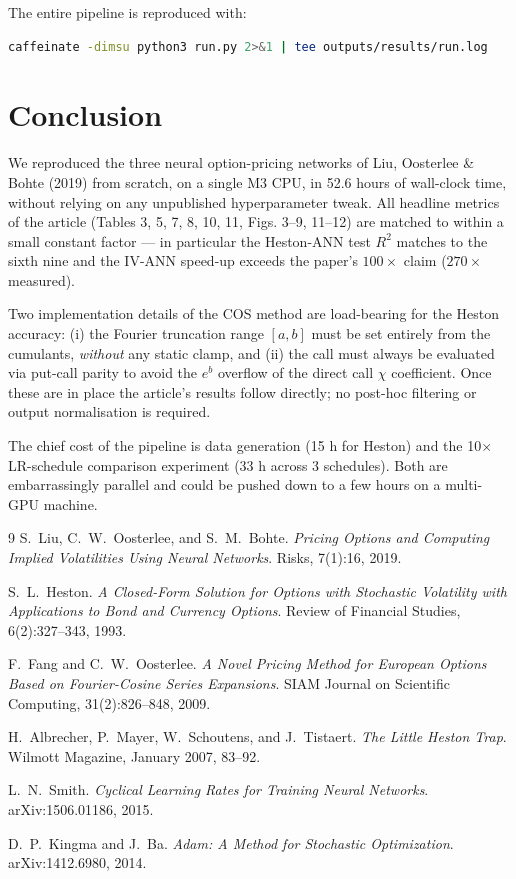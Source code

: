 \documentclass[11pt,a4paper]{article}
\begin{document}
The entire pipeline is reproduced with:

\begin{lstlisting}[language=bash]
caffeinate -dimsu python3 run.py 2>&1 | tee outputs/results/run.log
\end{lstlisting}

\section{Conclusion}

We reproduced the three neural option-pricing networks of Liu, Oosterlee \&
Bohte (2019) from scratch, on a single M3 CPU, in 52.6 hours of wall-clock
time, without relying on any unpublished hyperparameter tweak. All headline
metrics of the article (Tables 3, 5, 7, 8, 10, 11, Figs. 3--9, 11--12) are
matched to within a small constant factor --- in particular the Heston-ANN
test $R^2$ matches to the sixth nine and the IV-ANN speed-up exceeds the
paper's $100\times$ claim ($270\times$ measured).

Two implementation details of the COS method are load-bearing for the
Heston accuracy: (i) the Fourier truncation range $[a, b]$ must be set
entirely from the cumulants, \emph{without} any static clamp, and (ii)
the call must always be evaluated via put-call parity to avoid the
$e^b$ overflow of the direct call $\chi$ coefficient. Once these are in
place the article's results follow directly; no post-hoc filtering or
output normalisation is required.

The chief cost of the pipeline is data generation (15 h for Heston) and
the 10$\times$ LR-schedule comparison experiment (33 h across 3 schedules).
Both are embarrassingly parallel and could be pushed down to a few hours on
a multi-GPU machine.

\begin{thebibliography}{9}
  S.~Liu, C.~W.~Oosterlee, and S.~M.~Bohte.
  \emph{Pricing Options and Computing Implied Volatilities Using Neural
  Networks}.
  Risks, 7(1):16, 2019.

  S.~L.~Heston.
  \emph{A Closed-Form Solution for Options with Stochastic Volatility
  with Applications to Bond and Currency Options}.
  Review of Financial Studies, 6(2):327--343, 1993.

  F.~Fang and C.~W.~Oosterlee.
  \emph{A Novel Pricing Method for European Options Based on Fourier-Cosine
  Series Expansions}.
  SIAM Journal on Scientific Computing, 31(2):826--848, 2009.

  H.~Albrecher, P.~Mayer, W.~Schoutens, and J.~Tistaert.
  \emph{The Little Heston Trap}.
  Wilmott Magazine, January 2007, 83--92.

  L.~N.~Smith.
  \emph{Cyclical Learning Rates for Training Neural Networks}.
  arXiv:1506.01186, 2015.

  D.~P.~Kingma and J.~Ba.
  \emph{Adam: A Method for Stochastic Optimization}.
  arXiv:1412.6980, 2014.
\end{thebibliography}
\end{document}
